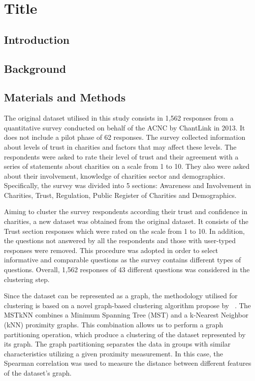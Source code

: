 \documentclass{article}
\begin{document}



\section{Title}

\subsection{Introduction}

\subsection{Background}

\subsection{Materials and Methods}


The original dataset utilised in this study consists in 1,562 responses from a
quantitative survey conducted on behalf of the ACNC by ChantLink in 2013. It
does not include a pilot phase of 62 responses. The survey collected information
about levels of trust in charities and factors that may affect these levels. The
respondents were asked to rate their level of trust and their agreement with a
series of statements about charities on a scale from 1 to 10. They also were
asked about their involvement, knowledge of charities sector and demographics.
Specifically, the survey was divided into 5 sections: Awareness and Involvement
in Charities, Trust, Regulation, Public Register of Charities and Demographics.

Aiming to cluster the survey respondents according their trust and confidence in
charities, a new dataset was obtained from the original dataset. It consists of
the Trust section responses which were rated on the scale from 1 to 10. In
addition, the questions not answered by all the respondents and those with
user-typed responses were removed. This procedure was adopted in order to select
informative and comparable questions as the survey contains different types of
questions. Overall, 1,562 responses of 43 different questions was considered in
the clustering step.

Since the dataset can be represented as a graph, the methodology utilised for
clustering is based on a novel graph-based clustering algorithm propose by
~\cite{Inostroza2008}. The MSTkNN combines a Minimum Spanning Tree (MST) and a
k-Nearest Neighbor (kNN) proximity graphs. This combination allows us to perform
a graph partitioning operation, which produce a clustering of the dataset
represented by its graph. The graph partitioning separates the data in groups
with similar characteristics utilizing a given proximity measurement. In this
case, the Spearman correlation was used to measure the distance between
different features of the dataset's graph.
\end{document}
